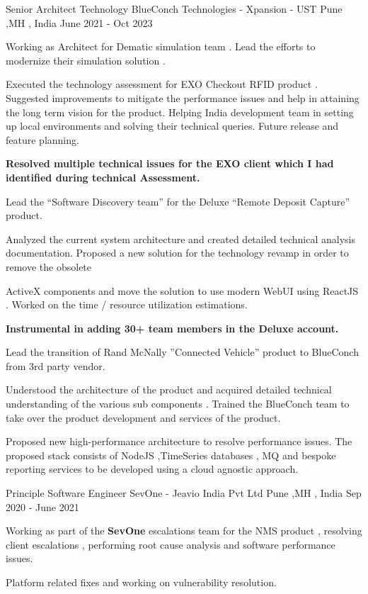 \begin{cventries}
  \vspace{4mm}
  \cventry
    {Senior Architect Technology}
    {BlueConch Technologies - Xpansion - UST }
    {Pune ,MH , India}
    {June 2021 - Oct 2023}
    {
        \begin{cvitems}
          \item Working as Architect for Dematic simulation team . Lead the efforts to modernize their  simulation solution .
          \item Executed the technology assessment for EXO Checkout RFID product . Suggested improvements to mitigate the performance issues and help in attaining the long term vision for the product. Helping India development team in setting up local environments and solving their technical queries. Future release and feature planning.
          \item \textbf{Resolved multiple technical issues for the EXO client which I had identified during technical Assessment.}
          \item Lead the “Software Discovery team” for the Deluxe “Remote Deposit Capture” product.
          \item Analyzed the current system architecture and created detailed technical analysis documentation. Proposed a new solution for the technology revamp in order to remove the obsolete          
          \item ActiveX components and move the solution to use modern WebUI using ReactJS . Worked on the time / resource utilization estimations.
          \item \textbf{Instrumental in adding 30+ team members in the Deluxe account.}
          \item Lead the transition of Rand McNally ”Connected Vehicle” product to BlueConch from 3rd party vendor.
          \item Understood the architecture of the product and acquired detailed technical understanding of the various sub components . Trained the BlueConch team to take over the product development and services of the product.
          \item Proposed new high-performance architecture to resolve performance issues. The proposed stack consists of NodeJS ,TimeSeries databases , MQ and bespoke reporting services to be developed using a cloud agnostic approach.
        \end{cvitems}
    }
  \vspace{4mm}

  \cventry
    {Principle Software Engineer}
    {SevOne - Jeavio India Pvt Ltd}
    {Pune ,MH , India}
    {Sep 2020  - June 2021}  
    {
      \begin{cvitems}
        \item Working as part of the \textbf{SevOne} escalations team for the NMS product , resolving client escalations , performing root cause analysis and software performance issues.
        \item Platform related fixes and working on vulnerability resolution.
      \end{cvitems}
    }  


\end{cventries}
